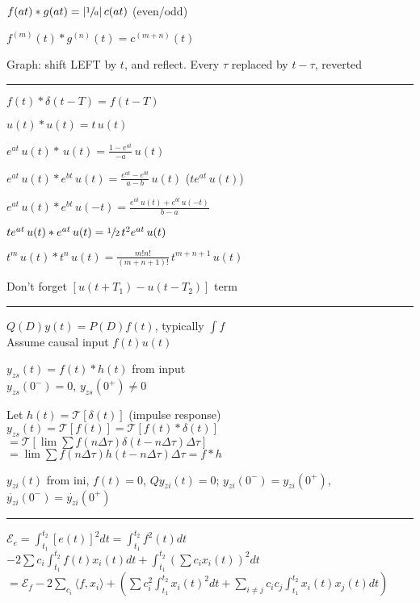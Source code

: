 \documentclass[4pt]{article}
\theoremstyle{definition}
\theoremstyle{definition}
\begin{document}
     $f(at) * g(at) = |\sfrac{1}{a}|\, c(at)$ (even/odd)

     $f^{(m)} (t) * g^{(n)} (t) = c^{(m+n)}(t)$


    Graph: shift LEFT by $t$, and reflect. Every $\tau$ replaced by $t-\tau$, reverted
\rule{\linewidth}{0.5pt}
    $f(t) * \delta(t-T) = f(t-T)$
    
    $u(t) * u(t) = t \, u(t)$

    $e^{at} \,u(t)* \,u(t) = \frac{1-e^{at}}{-a}\, u(t)$

    $e^{at}\,u(t) * e^{bt}\,u(t) = \frac{e^{at} - e^{bt}}{a - b}\, u(t)$ ($te^{at} \, u(t)$) 

    $e^{at}\, u(t) * e^{bt} \,u(-t) = \frac{e^{at} \, u(t) + e^{bt} \, u(-t)}{b-a}$

    $te^{at}\,u(t) * e^{at} \,u(t)= \sfrac{1}{2} \,t^2e^{at} \, u(t)$

    $t^m\, u(t) * t^n \, u(t) = \frac{m!n!}{(m+n+1)!}\, t^{m+n+1} \, u(t)$

    Don't forget $[u(t+T_1) - u(t-T_2)]$ term
\rule{\linewidth}{0.5pt}
    $Q(D) y(t) = P(D) f(t)$, typically $\int f$\\
    Assume causal input $f(t) u(t)$

    $y_{zs}(t) = f(t) * h(t)$ from input\\    
        $y_{zs}(0^-) = 0$, $y_{zs}(0^+) \neq 0$

        Let $h(t) = \mathcal{T} [\delta (t)]$ (impulse response)
            $y_{zs}(t)=\mathcal{T} [f(t)] = \mathcal{T} [f(t) * \delta (t)]$\\
            $=\mathcal{T}[\lim\sum f(n\Delta\tau) \delta(t - n\Delta\tau) \Delta\tau]$\\
            $=\lim\sum f(n\Delta\tau) h(t-n\Delta\tau)\Delta\tau = f * h$
            
        $y_{zi}(t)$ from ini, $f(t)=0$,
            $Q y_{zi}(t) = 0$;
            $y_{zi}(0^-) = y_{zi}(0^+)$, $\dot{y_{zi}}(0^-) = \dot{y_{zi}}(0^+)$
\rule{\linewidth}{0.5pt}
    $\mathcal{E}_e = \int_{t_1}^{t_2} [e(t)]^2 dt = \int_{t_1}^{t_2} f^2(t)dt$\\
    $- 2\sum c_i \int_{t_1}^{t_2} f(t) x_i(t) dt + \int_{t_1}^{t_2} (\sum c_i x_i(t))^2 dt$\\
    $    = \mathcal{E}_f -  2\sum_{c_i} \langle f, x_i \rangle +
    (\sum c_i^2 \int_{t_1}^{t_2} x_i(t)^2 dt + \sum_{i\neq j} c_i c_j \int_{t_1}^{t_2} x_i(t) x_j(t) dt)$
        
\end{document}
